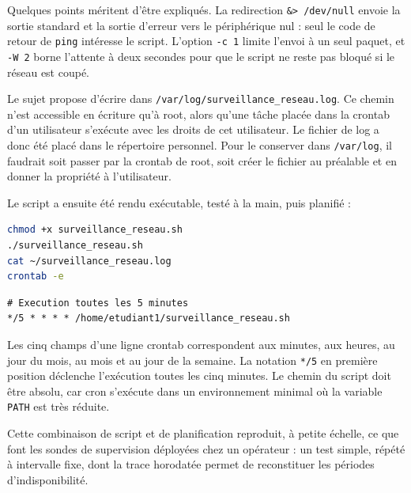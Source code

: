 \documentclass[11pt,a4paper]{article}
\begin{document}
Quelques points m\'eritent d'\^etre expliqu\'es. La redirection \texttt{\&> /dev/null} envoie la sortie
standard et la sortie d'erreur vers le p\'eriph\'erique nul : seul le code de retour de \texttt{ping}
int\'eresse le script. L'option \texttt{-c 1} limite l'envoi \`a un seul paquet, et \texttt{-W 2} borne
l'attente \`a deux secondes pour que le script ne reste pas bloqu\'e si le r\'eseau est coup\'e.

Le sujet propose d'\'ecrire dans \texttt{/var/log/surveillance\_reseau.log}. Ce chemin n'est accessible en
\'ecriture qu'\`a root, alors qu'une t\^ache plac\'ee dans la crontab d'un utilisateur s'ex\'ecute avec les
droits de cet utilisateur. Le fichier de log a donc \'et\'e plac\'e dans le r\'epertoire personnel. Pour le
conserver dans \texttt{/var/log}, il faudrait soit passer par la crontab de root, soit cr\'eer le fichier au
pr\'ealable et en donner la propri\'et\'e \`a l'utilisateur.

Le script a ensuite \'et\'e rendu ex\'ecutable, test\'e \`a la main, puis planifi\'e :

\begin{lstlisting}[language=bash]
chmod +x surveillance_reseau.sh
./surveillance_reseau.sh
cat ~/surveillance_reseau.log
crontab -e
\end{lstlisting}

\begin{lstlisting}
# Execution toutes les 5 minutes
*/5 * * * * /home/etudiant1/surveillance_reseau.sh
\end{lstlisting}

Les cinq champs d'une ligne crontab correspondent aux minutes, aux heures, au jour du mois, au mois et au
jour de la semaine. La notation \texttt{*/5} en premi\`ere position d\'eclenche l'ex\'ecution toutes les cinq
minutes. Le chemin du script doit \^etre absolu, car cron s'ex\'ecute dans un environnement minimal o\`u la
variable \texttt{PATH} est tr\`es r\'eduite.


Cette combinaison de script et de planification reproduit, \`a petite \'echelle, ce que font les sondes de
supervision d\'eploy\'ees chez un op\'erateur : un test simple, r\'ep\'et\'e \`a intervalle fixe, dont la
trace horodat\'ee permet de reconstituer les p\'eriodes d'indisponibilit\'e.
\end{document}

